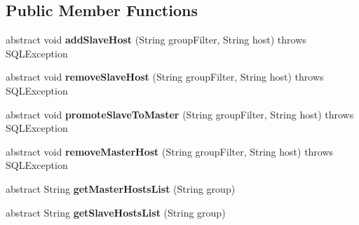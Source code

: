 \subsection*{Public Member Functions}
\begin{DoxyCompactItemize}
\item 
\mbox{\label{interfacecom_1_1mysql_1_1jdbc_1_1jmx_1_1_replication_group_manager_m_bean_a03fbefa5c21081dfb2499a3a3053d7e3}} 
abstract void {\bfseries add\+Slave\+Host} (String group\+Filter, String host)  throws S\+Q\+L\+Exception
\item 
\mbox{\label{interfacecom_1_1mysql_1_1jdbc_1_1jmx_1_1_replication_group_manager_m_bean_a5f79d65c1c5e74f4a21d0f4cfd483d76}} 
abstract void {\bfseries remove\+Slave\+Host} (String group\+Filter, String host)  throws S\+Q\+L\+Exception
\item 
\mbox{\label{interfacecom_1_1mysql_1_1jdbc_1_1jmx_1_1_replication_group_manager_m_bean_a84f18041d311f16f360492b8dd9a6cf0}} 
abstract void {\bfseries promote\+Slave\+To\+Master} (String group\+Filter, String host)  throws S\+Q\+L\+Exception
\item 
\mbox{\label{interfacecom_1_1mysql_1_1jdbc_1_1jmx_1_1_replication_group_manager_m_bean_aafc3cb4074ecf2576941eb8ccb73ade1}} 
abstract void {\bfseries remove\+Master\+Host} (String group\+Filter, String host)  throws S\+Q\+L\+Exception
\item 
\mbox{\label{interfacecom_1_1mysql_1_1jdbc_1_1jmx_1_1_replication_group_manager_m_bean_ae953ab1a5c36d33fa0dfa37f6ba9f53f}} 
abstract String {\bfseries get\+Master\+Hosts\+List} (String group)
\item 
\mbox{\label{interfacecom_1_1mysql_1_1jdbc_1_1jmx_1_1_replication_group_manager_m_bean_a389a7d8c571e4ce7323cb19f2bd3dd3e}} 
abstract String {\bfseries get\+Slave\+Hosts\+List} (String group)
\item 

\end{DoxyCompactItemize}
